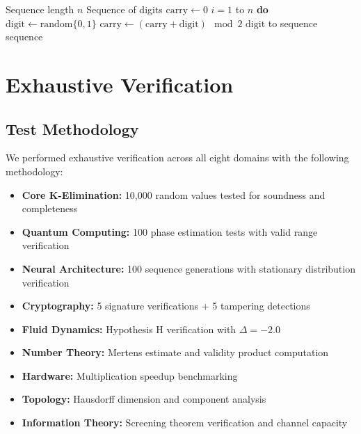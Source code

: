 \documentclass[11pt,letterpaper]{article}
\begin{document}
\begin{algorithm}[h]
\caption{Neural Sequence Generation with Carry State}
\label{alg:neural}
\begin{algorithmic}[1]
 Sequence length \(n\)
 Sequence of digits
\STATE \(\text{carry} \gets 0\)
 \(i = 1\) to \(n\) {\bf do}
\STATE \quad \(\text{digit} \gets \text{random}\{0, 1\}\)
\STATE \quad \(\text{carry} \gets (\text{carry} + \text{digit}) \mod 2\)
\STATE {} \(\text{digit}\) to sequence
 sequence
\end{algorithmic}
\end{algorithm}

\newpage

\section{Exhaustive Verification}
\label{sec:verification}

\subsection{Test Methodology}

We performed exhaustive verification across all eight domains with the following methodology:

\begin{itemize}
\item {\bf Core K-Elimination:} 10,000 random values tested for soundness and completeness
\item {\bf Quantum Computing:} 100 phase estimation tests with valid range verification
\item {\bf Neural Architecture:} 100 sequence generations with stationary distribution verification
\item {\bf Cryptography:} 5 signature verifications + 5 tampering detections
\item {\bf Fluid Dynamics:} Hypothesis H verification with \(\Delta = -2.0\)
\item {\bf Number Theory:} Mertens estimate and validity product computation
\item {\bf Hardware:} Multiplication speedup benchmarking
\item {\bf Topology:} Hausdorff dimension and component analysis
\item {\bf Information Theory:} Screening theorem verification and channel capacity
\end{itemize}
\end{document}
